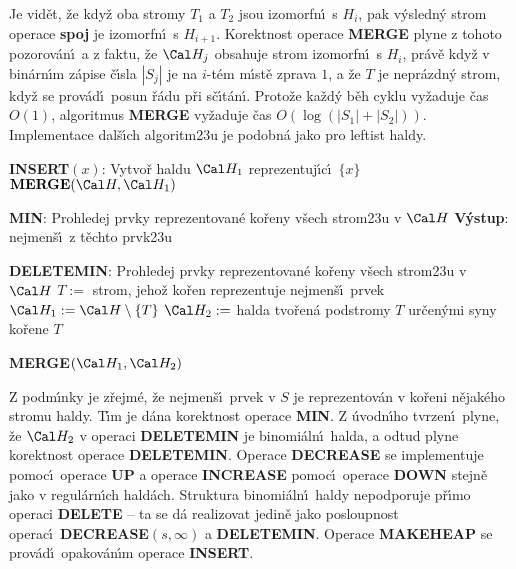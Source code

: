 \documentclass[a4paper,12pt]{article}
\begin{document}
\flushpar Je vid\v et, \v ze kdy\v z oba stromy $T_1$ a $T_2$ jsou izomorfn\'\i\ 
s $H_i$, pak v\'ysledn\'y strom operace {\bf spoj} je izomorfn\'\i\ 
s $H_{i+1}$. Korektnost ope\-race {\bf MERGE} plyne z tohoto 
pozorov\'an\'\i\ a z faktu, \v ze $\Cal H_j$ obsahuje strom izomorfn\'\i\ s 
$H_i$, pr\'av\v e kdy\v z v bin\'arn\'\i m z\'apise \v c\'\i sla $
|S_j|$ je na $i$-t\'em 
m\'\i st\v e zprava $1$, a \v ze $T$ je nepr\'azdn\'y strom, kdy\v z se 
prov\'ad\'\i\ posun \v r\'adu p\v ri s\v c\'\i t\'an\'\i . Proto\v ze ka\v zd\'y b\v eh 
cyklu vy\v zaduje \v cas $O(1)$, algoritmus {\bf MER\-GE} vy\v zaduje \v cas 
$O(\log(|S_1|+|S_2|))$. Implementace dal\v s\'\i ch algoritm\accent23u 
je podobn\'a jako pro leftist haldy. 
\bigskip

{\bf INSERT$(x)$}:\newline 
Vytvo\v r haldu $\Cal H_1$ reprezentuj\'\i c\'\i\ $\{x\}$\newline 
$\bold M\bold E\bold R\bold G\bold E(\Cal H,\Cal H_1)$
\bigskip

{\bf MIN}:\newline 
Prohledej prvky reprezentovan\'e ko\v reny v\v sech strom\accent23u 
v $\Cal H$\newline 
{\bf V\'ystup}: nejmen\v s\'\i\ z t\v echto prvk\accent23u  
\bigskip

{\bf DELETEMIN}:\newline 
Prohledej prvky reprezentovan\'e ko\v reny v\v sech strom\accent23u 
v $\Cal H$\newline 
$T:=$ strom, jeho\v z ko\v ren reprezentuje nejmen\v s\'\i\ prvek\newline 
$\Cal H_1:=\Cal H\setminus \{T\}$\newline 
$\Cal H_2:=$ halda tvo\v ren\'a podstromy $T$ ur\v cen\'ymi syny ko\v rene $
T$\newline 
{\bf MERGE$(\Cal H_1,\Cal H_2)$
\bigskip

}\flushpar Z podm\'\i nky  je z\v rejm\'e, \v ze 
nejmen\v s\'\i\ prvek v $S$ je reprezentov\'an v ko\v reni n\v ejak\'eho  
stromu haldy. T\'\i m je d\'ana korekt\-nost operace {\bf MIN}.
Z \'uvodn\'\i ho tvrzen\'\i\ plyne, \v ze $\Cal H_2$ v operaci {\bf DELE\-TE\-MIN} je 
binomi\'aln\'\i\ halda, a odtud plyne korekt\-nost ope\-race 
{\bf DE\-LE\-TEMIN}. Operace {\bf DECREASE} se implementuje pomoc\'\i\ 
ope\-race {\bf UP} a ope\-race {\bf INCREASE} pomoc\'\i\ 
operace {\bf DOWN} stejn\v e jako v regul\'arn\'\i ch hald\'ach. 
Struktura binomi\'aln\'\i\ haldy nepodporuje p\v r\'\i mo operaci 
{\bf DELETE} -- ta se d\'a realizovat jedin\v e jako posloupnost 
operac\'\i\ {\bf DECREASE$(s,\infty )$} a {\bf DELETEMIN}.  
Operace {\bf MAKEHEAP} se prov\'ad\'\i\ opakov\'an\'\i m operace {\bf INSERT}.
\medskip
\end{document}
